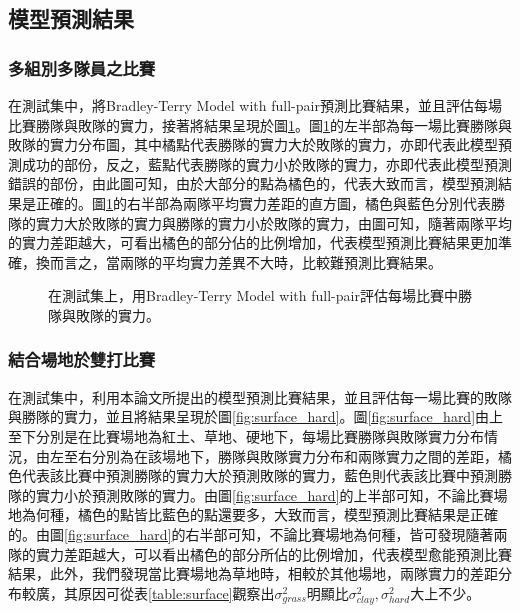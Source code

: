 \documentclass[12pt]{article}
\begin{document}
\subsection{模型預測結果}
\subsubsection{多組別多隊員之比賽}
在測試集中，將Bradley-Terry Model with full-pair預測比賽結果，並且評估每場比賽勝隊與敗隊的實力，接著將結果呈現於圖\ref{fig:b-t}。圖\ref{fig:b-t}的左半部為每一場比賽勝隊與敗隊的實力分布圖，其中橘點代表勝隊的實力大於敗隊的實力，亦即代表此模型預測成功的部份，反之，藍點代表勝隊的實力小於敗隊的實力，亦即代表此模型預測錯誤的部份，由此圖可知，由於大部分的點為橘色的，代表大致而言，模型預測結果是正確的。圖\ref{fig:b-t}的右半部為兩隊平均實力差距的直方圖，橘色與藍色分別代表勝隊的實力大於敗隊的實力與勝隊的實力小於敗隊的實力，由圖可知，隨著兩隊平均的實力差距越大，可看出橘色的部分佔的比例增加，代表模型預測比賽結果更加準確，換而言之，當兩隊的平均實力差異不大時，比較難預測比賽結果。

\begin{figure}[h!]
\centering
{}
\caption{在測試集上，用Bradley-Terry Model with full-pair評估每場比賽中勝隊與敗隊的實力。}
\label{fig:b-t}
\end{figure}
\subsubsection{結合場地於雙打比賽}
在測試集中，利用本論文所提出的模型預測比賽結果，並且評估每一場比賽的敗隊與勝隊的實力，並且將結果呈現於圖\ref{fig:surface_hard}。圖\ref{fig:surface_hard}由上至下分別是在比賽場地為紅土、草地、硬地下，每場比賽勝隊與敗隊實力分布情況，由左至右分別為在該場地下，勝隊與敗隊實力分布和兩隊實力之間的差距，橘色代表該比賽中預測勝隊的實力大於預測敗隊的實力，藍色則代表該比賽中預測勝隊的實力小於預測敗隊的實力。由圖\ref{fig:surface_hard}的上半部可知，不論比賽場地為何種，橘色的點皆比藍色的點還要多，大致而言，模型預測比賽結果是正確的。由圖\ref{fig:surface_hard}的右半部可知，不論比賽場地為何種，皆可發現隨著兩隊的實力差距越大，可以看出橘色的部分所佔的比例增加，代表模型愈能預測比賽結果，此外，我們發現當比賽場地為草地時，相較於其他場地，兩隊實力的差距分布較廣，其原因可從表\ref{table:surface}觀察出$\sigma^2_{grass}$明顯比$\sigma^2_{clay},\sigma^2_{hard}$大上不少。
\end{document}
